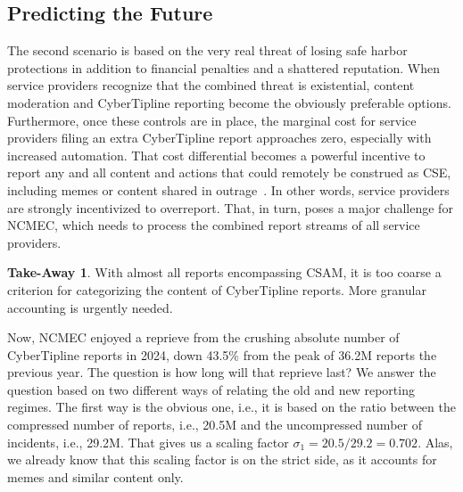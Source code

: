 \documentclass[anonymous,nonacm,screen,12pt]{acmart}
\newcommand\V[1]{{#1}}
\newcommand\V[1]{\textsc{\MakeLowercase{#1}}}
\theoremstyle{definition}
\newtheorem{takeout}{Take-Away}
\begin{document}
\subsection{Predicting the Future}

The second scenario is based on the very real threat of losing safe harbor
protections in addition to financial penalties and a shattered reputation. When
service providers recognize that the combined threat is existential, content
moderation and CyberTipline reporting become the obviously preferable options.
Furthermore, once these controls are in place, the marginal cost for service
providers filing an extra CyberTipline report approaches zero, especially with
increased automation. That cost differential becomes a powerful incentive to
report any and all content and actions that could remotely be construed as
\V{CSE}, including memes or content shared in
outrage~\cite{GrossmanPfefferkornea2024}. In other words, service providers are
strongly incentivized to overreport. That, in turn, poses a major challenge for
\V{NCMEC}, which needs to process the combined report streams of all service
providers.

\begin{takeout}
With almost all reports encompassing \V{CSAM}, it is too coarse a criterion for
categorizing the content of CyberTipline reports. More granular accounting is
urgently needed.
\end{takeout}

\noindent{}Now, \V{NCMEC} enjoyed a reprieve from the crushing absolute number
of CyberTipline reports in 2024, down 43.5\% from the peak of 36.2\V{M} reports
the previous year. The question is how long will that reprieve last? We answer
the question based on two different ways of relating the old and new reporting
regimes. The first way is the obvious one, i.e., it is based on the ratio
between the compressed number of reports, i.e., 20.5\V{M} and the uncompressed
number of incidents, i.e., 29.2\V{M}. That gives us a scaling factor $\sigma_1
= 20.5 / 29.2 = 0.702$. Alas, we already know that this scaling factor is on the
strict side, as it accounts for memes and similar content only.
\end{document}
